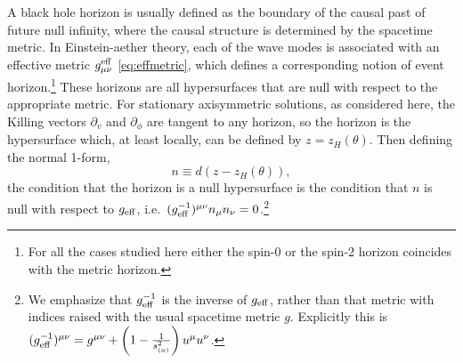 \documentclass[12pt]{article}
\numberwithin{equation}{section}
\begin{document}
A black hole horizon is usually defined as the boundary of the causal past of future null infinity, where the causal structure is determined by the spacetime metric. 
In Einstein-aether theory, each of the wave modes is associated with 
an effective metric $g^{\rm eff}_{\mu\nu}$ \eqref{eq:effmetric}, which defines
a corresponding notion of event horizon.\footnote{For all the 
cases studied here either 
the spin-0 or the spin-2 horizon coincides with the metric horizon.}
These horizons are all 
hypersurfaces that are null with respect to the appropriate metric. 
For stationary axisymmetric solutions, as considered here, the Killing 
vectors $\partial_v$ and $\partial_\phi$ are tangent to any horizon, 
so the horizon is the hypersurface which, at least locally, can be defined by $z = z_H(\theta)$.
Then defining the normal 1-form, 
%
\begin{equation}\label{n}
n \equiv d(z - z_H(\theta)),
\end{equation} 
the condition that the horizon is a null hypersurface is the condition that $n$ is null with respect to $g_{\rm eff}$, i.e.\ $(g^{-1}_{\rm eff})^{\mu\nu} n_\mu n_\nu = 0$.\footnote{We emphasize that $g^{-1}_{\rm eff}$ is the inverse of $g_{\rm eff}$, rather than that metric with indices raised with the usual spacetime metric $g$. Explicitly this is $(g^{-1}_{\rm eff})^{\mu\nu} = g^{\mu\nu} + \left( 1 - \frac{1}{s_{(a)}^2} \right) u^\mu u^\nu$.}
\end{document}
